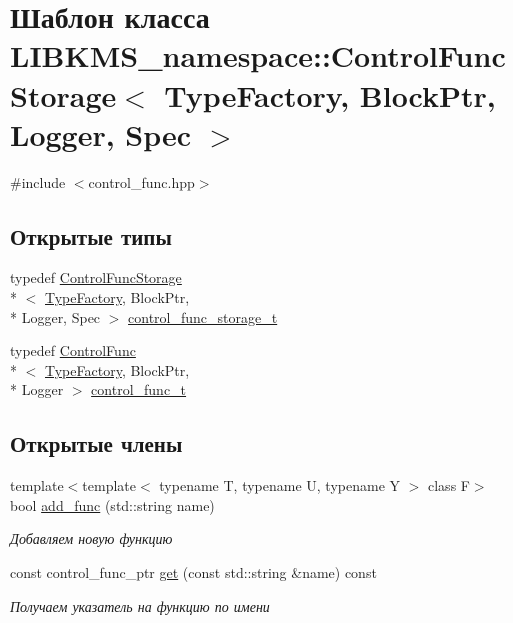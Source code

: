 \hypertarget{classLIBKMS__namespace_1_1ControlFuncStorage}{\section{Шаблон класса L\-I\-B\-K\-M\-S\-\_\-namespace\-:\-:Control\-Func\-Storage$<$ Type\-Factory, Block\-Ptr, Logger, Spec $>$}
\label{classLIBKMS__namespace_1_1ControlFuncStorage}
}


{\ttfamily \#include $<$control\-\_\-func.\-hpp$>$}

\subsection*{Открытые типы}
\begin{DoxyCompactItemize}
\item 
typedef \hyperlink{classLIBKMS__namespace_1_1ControlFuncStorage}{Control\-Func\-Storage}\\*
$<$ \hyperlink{classLIBKMS__namespace_1_1TypeFactory}{Type\-Factory}, Block\-Ptr, \\*
Logger, Spec $>$ \hyperlink{classLIBKMS__namespace_1_1ControlFuncStorage_ad9bffebc36d4a24c52884274e207ecd7}{control\-\_\-func\-\_\-storage\-\_\-t}
\item 
typedef \hyperlink{classLIBKMS__namespace_1_1ControlFunc}{Control\-Func}\\*
$<$ \hyperlink{classLIBKMS__namespace_1_1TypeFactory}{Type\-Factory}, Block\-Ptr, \\*
Logger $>$ \hyperlink{classLIBKMS__namespace_1_1ControlFuncStorage_a69b15024d98e8df2ebe35447de1acd34}{control\-\_\-func\-\_\-t}
\end{DoxyCompactItemize}
\subsection*{Открытые члены}
\begin{DoxyCompactItemize}
\item 
{\footnotesize template$<$template$<$ typename T, typename U, typename Y $>$ class F$>$ }\\bool \hyperlink{classLIBKMS__namespace_1_1ControlFuncStorage_a8c8b2bde18b8bfe909737e6e2cdacf49}{add\-\_\-func} (std\-::string name)
\begin{DoxyCompactList}\small\item\em Добавляем новую функцию \end{DoxyCompactList}\item 
const control\-\_\-func\-\_\-ptr \hyperlink{classLIBKMS__namespace_1_1ControlFuncStorage_a7518fbd7426301d1b29039feb25c7060}{get} (const std\-::string \&name) const 
\begin{DoxyCompactList}\small\item\em Получаем указатель на функцию по имени \end{DoxyCompactList}\end{DoxyCompactItemize}
